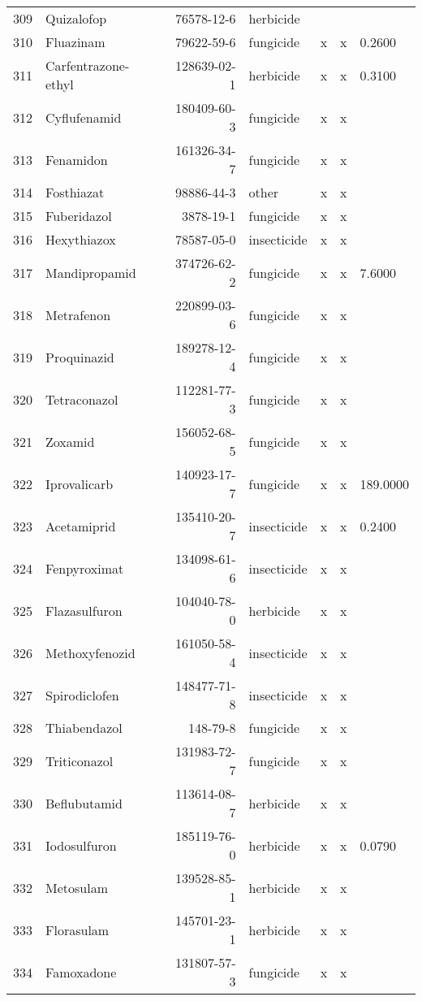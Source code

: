 \begin{longtable}{lp{3cm}rlp{0.5cm}p{0.5cm}p{1.5cm}}
  309 & Quizalofop & 76578-12-6 & herbicide &  &  &  \\ 
  310 & Fluazinam & 79622-59-6 & fungicide & x & x & 0.2600 \\ 
  311 & Carfentrazone-ethyl & 128639-02-1 & herbicide & x & x & 0.3100 \\ 
  312 & Cyflufenamid & 180409-60-3 & fungicide & x & x &  \\ 
  313 & Fenamidon & 161326-34-7 & fungicide & x & x &  \\ 
  314 & Fosthiazat & 98886-44-3 & other & x & x &  \\ 
  315 & Fuberidazol & 3878-19-1 & fungicide & x & x &  \\ 
  316 & Hexythiazox & 78587-05-0 & insecticide & x & x &  \\ 
  317 & Mandipropamid & 374726-62-2 & fungicide & x & x & 7.6000 \\ 
  318 & Metrafenon & 220899-03-6 & fungicide & x & x &  \\ 
  319 & Proquinazid & 189278-12-4 & fungicide & x & x &  \\ 
  320 & Tetraconazol & 112281-77-3 & fungicide & x & x &  \\ 
  321 & Zoxamid & 156052-68-5 & fungicide & x & x &  \\ 
  322 & Iprovalicarb & 140923-17-7 & fungicide & x & x & 189.0000 \\ 
  323 & Acetamiprid & 135410-20-7 & insecticide & x & x & 0.2400 \\ 
  324 & Fenpyroximat & 134098-61-6 & insecticide & x & x &  \\ 
  325 & Flazasulfuron & 104040-78-0 & herbicide & x & x &  \\ 
  326 & Methoxyfenozid & 161050-58-4 & insecticide & x & x &  \\ 
  327 & Spirodiclofen & 148477-71-8 & insecticide & x & x &  \\ 
  328 & Thiabendazol & 148-79-8 & fungicide & x & x &  \\ 
  329 & Triticonazol & 131983-72-7 & fungicide & x & x &  \\ 
  330 & Beflubutamid & 113614-08-7 & herbicide & x & x &  \\ 
  331 & Iodosulfuron & 185119-76-0 & herbicide & x & x & 0.0790 \\ 
  332 & Metosulam & 139528-85-1 & herbicide & x & x &  \\ 
  333 & Florasulam & 145701-23-1 & herbicide & x & x &  \\ 
  334 & Famoxadone & 131807-57-3 & fungicide & x & x &  \\ 

\end{longtable}
